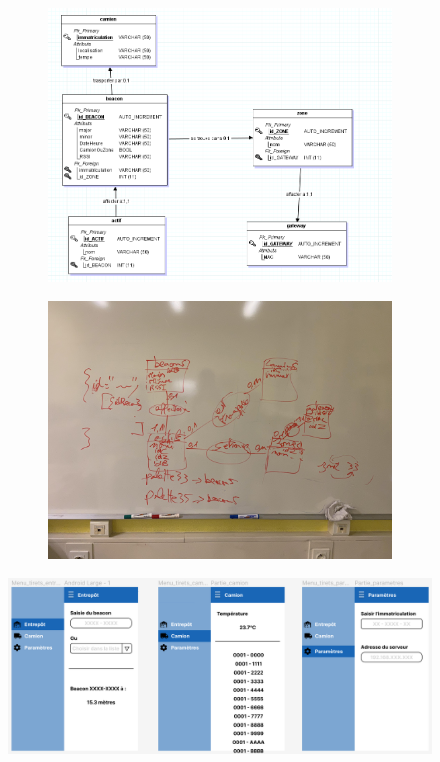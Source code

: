 \documentclass[10pt,a4paper]{book}
\begin{document}
\begin{figure}[h!]
    \centering
    \begin{subfigure}[b]{0.45\textwidth}
        \centering
        \includegraphics[scale=0.14]{Images/MLD_proposition_nous.png}
        \caption{}
        \label{MLD_proposition_nous} 
    \end{subfigure}
    \begin{subfigure}[b]{0.45\textwidth}
        \includegraphics[scale=0.14]{Images/MLD_proposition_hacquard.jpg}
        \caption{}
        \label{MLD_proposition_hacquard}
    \end{subfigure}
    \caption{}
\end{figure}

\begin{figure}[h!]
    \centering
    \includegraphics[scale=0.2]{Images/figma_v1.png}
    \caption{}
    \label{figma_v1}
\end{figure}
\end{document}
